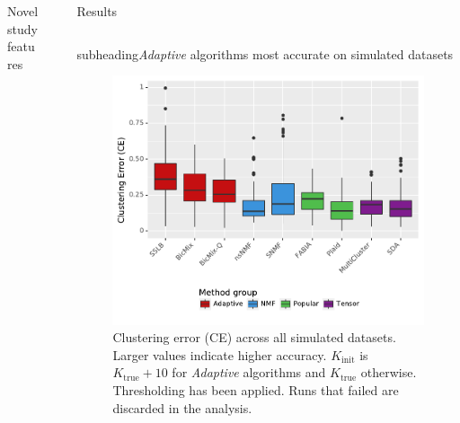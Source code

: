\documentclass[xcolor=table,final]{beamer}
\newlength{\sepwid}
\newlength{\onecolwid}
\newlength{\twocolwid}
\newcommand{\kcnsubheading}[1]{\begin{beamercolorbox}[rounded=true]{subheading}{\large #1}\end{beamercolorbox}}
\begin{document}
\begin{frame}[t]
\begin{columns}[t]
\begin{column}{\onecolwid}
\begin{block}{Novel study features}
\end{block}





\end{column} %

\begin{column}{\sepwid}\end{column} %

\begin{column}{\twocolwid} %


\begin{block}{Results}
\end{block}

\begin{columns}
\begin{column}{\onecolwid}

\kcnsubheading{\textit{Adaptive} algorithms most accurate on simulated datasets}

\begin{figure}
\includegraphics[width=0.9 \textwidth]{plots/summary_clust_err_best_theoretical_K_init.pdf}
\caption{Clustering error (CE) across all simulated datasets. Larger values indicate higher accuracy. $K_\text{init}$ is $K_\text{true}+10$ for \textit{Adaptive} algorithms and $K_\text{true}$ otherwise. Thresholding has been applied. Runs that failed are discarded in the analysis.}
\end{figure}


\end{column}
\end{columns}
\end{column}
\end{columns}
\end{frame}
\end{document}

